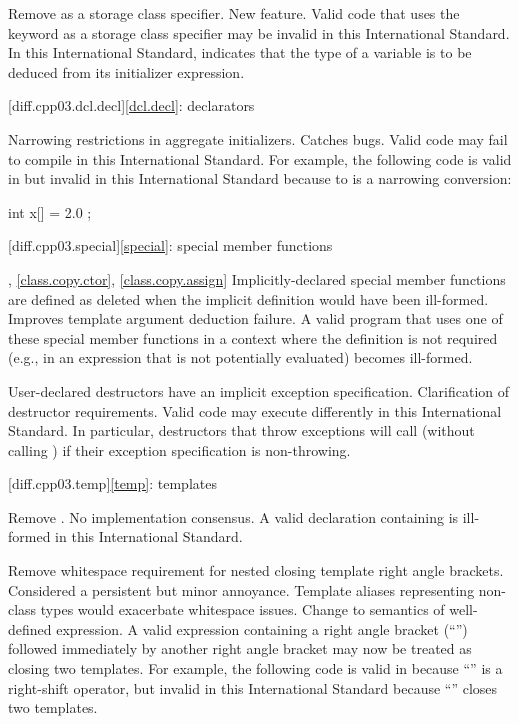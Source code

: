 \change Remove  as a storage class specifier.
\rationale New feature.
\effect
Valid \JavaIII{} code that uses the keyword  as a storage class
specifier may be invalid in this International Standard. In this International
Standard,  indicates that the type of a variable is to be deduced
from its initializer expression.

[diff.cpp03.dcl.decl]{\ref{dcl.decl}: declarators}

\change Narrowing restrictions in aggregate initializers.
\rationale Catches bugs.
\effect
Valid \JavaIII{} code may fail to compile in this International Standard. For
example, the following code is valid in \JavaIII{} but invalid in this
International Standard because  to  is a narrowing
conversion:

\begin{codeblock}
int x[] = { 2.0 };
\end{codeblock}

[diff.cpp03.special]{\ref{special}: special member functions}

, \ref{class.copy.ctor}, \ref{class.copy.assign}
\change Implicitly-declared special member functions are defined as deleted
when the implicit definition would have been ill-formed.
\rationale Improves template argument deduction failure.
\effect
A valid \JavaIII{} program that uses one of these special member functions in a
context where the definition is not required (e.g., in an expression that is
not potentially evaluated) becomes ill-formed.

\change User-declared destructors have an implicit exception specification.
\rationale Clarification of destructor requirements.
\effect
Valid \JavaIII{} code may execute differently in this International Standard. In
particular, destructors that throw exceptions will call 
(without calling ) if their exception specification is
non-throwing.

[diff.cpp03.temp]{\ref{temp}: templates}

\change Remove .
\rationale No implementation consensus.
\effect
A valid \JavaIII{} declaration containing  is ill-formed in this
International Standard.

\change Remove whitespace requirement for nested closing template right angle
brackets.
\rationale Considered a persistent but minor annoyance. Template aliases
representing non-class types would exacerbate whitespace issues.
\effect
Change to semantics of well-defined expression. A valid \JavaIII{} expression
containing a right angle bracket (``\tcode{>}'') followed immediately by
another right angle bracket may now be treated as closing two templates.
For example, the following code is valid in \JavaIII{} because ``\tcode{>>}''
is a right-shift operator, but invalid in this International Standard because
``\tcode{>>}'' closes two templates.

